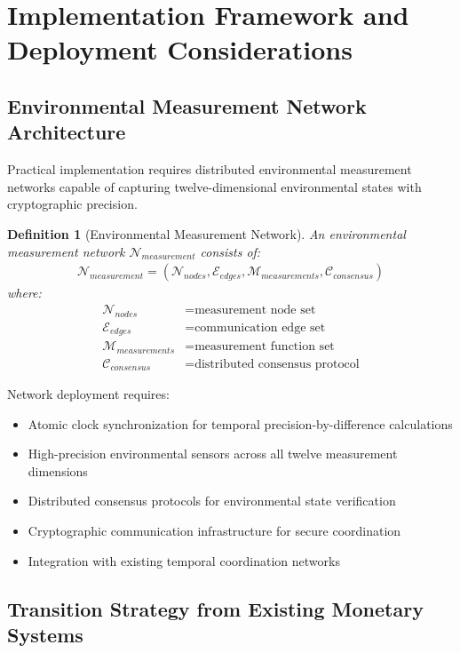 \documentclass[12pt,a4paper]{article}
\newtheorem{definition}[theorem]{Definition}
\begin{document}
\section{Implementation Framework and Deployment Considerations}

\subsection{Environmental Measurement Network Architecture}

Practical implementation requires distributed environmental measurement networks capable of capturing twelve-dimensional environmental states with cryptographic precision.

\begin{definition}[Environmental Measurement Network]
An environmental measurement network $\mathcal{N}_{measurement}$ consists of:
\begin{align}
\mathcal{N}_{measurement} = (\mathcal{N}_{nodes}, \mathcal{E}_{edges}, \mathcal{M}_{measurements}, \mathcal{C}_{consensus})
\end{align}
where:
\begin{align}
\mathcal{N}_{nodes} &= \text{measurement node set} \\
\mathcal{E}_{edges} &= \text{communication edge set} \\
\mathcal{M}_{measurements} &= \text{measurement function set} \\
\mathcal{C}_{consensus} &= \text{distributed consensus protocol}
\end{align}
\end{definition}

Network deployment requires:
\begin{itemize}
\item Atomic clock synchronization for temporal precision-by-difference calculations
\item High-precision environmental sensors across all twelve measurement dimensions
\item Distributed consensus protocols for environmental state verification
\item Cryptographic communication infrastructure for secure coordination
\item Integration with existing temporal coordination networks
\end{itemize}

\subsection{Transition Strategy from Existing Monetary Systems}
\end{document}
